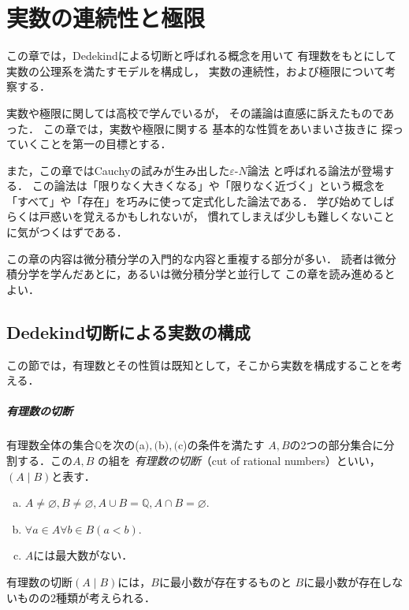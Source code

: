 \chapter{実数の連続性と極限}
\label{chp:realnumber}
 この章では，Dedekindによる切断と呼ばれる概念を用いて
 有理数をもとにして実数の公理系を満たすモデルを構成し，
 実数の連続性，および極限について考察する．

 実数や極限に関しては高校で学んでいるが，
 その議論は直感に訴えたものであった．
 この章では，実数や極限に関する
 基本的な性質をあいまいさ抜きに
 探っていくことを第一の目標とする．

 また，この章ではCauchyの試みが生み出した$\varepsilon$-$N$論法
 と呼ばれる論法が登場する．
 この論法は「限りなく大きくなる」や「限りなく近づく」という概念を
 「すべて」や「存在」を巧みに使って定式化した論法である．
 学び始めてしばらくは戸惑いを覚えるかもしれないが，
 慣れてしまえば少しも難しくないことに気がつくはずである．
 
 この章の内容は微分積分学の入門的な内容と重複する部分が多い．
 読者は微分積分学を学んだあとに，あるいは微分積分学と並行して
 この章を読み進めるとよい．

 
%
 \section{\textrm{Dedekind}切断による実数の構成}
 \label{sec:dedekind}
   この節では，有理数とその性質は既知として，そこから実数を構成することを考える．
 
   \paragraph{有理数の切断}
   有理数全体の集合$\mathbb{Q}$を次の(a$),($b$),($c)の条件を満たす
    $A,  B$の2つの部分集合に分割する．この$A,  B$
    の組を
    \emph{有理数の切断}（cut of rational numbers）といい，
    $(A \mid B)$と表す．
    \begin{enumerate}[(a) ]
      \item $A \neq \varnothing ,  B \neq \varnothing ,  
        A \cup B = \mathbb{Q} ,  A \cap B = \varnothing .$
      \item $\forall a \in A \forall b \in B ( a<b) .$
      \item $A$には最大数がない．
    \end{enumerate}
    有理数の切断$(A \mid B)$には，$B$に最小数が存在するものと
    $B$に最小数が存在しないものの2種類が考えられる．

